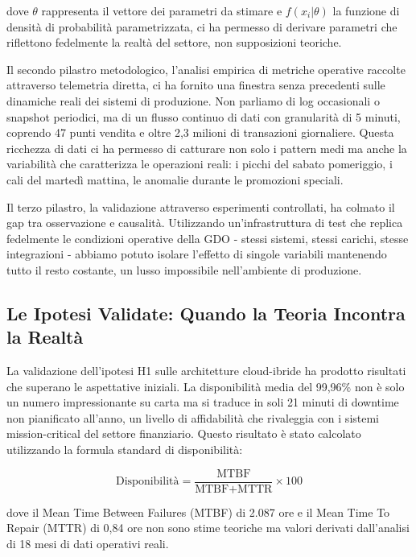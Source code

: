 dove $\theta$ rappresenta il vettore dei parametri da stimare e $f(x_i|\theta)$ la funzione di densità di probabilità parametrizzata, ci ha permesso di derivare parametri che riflettono fedelmente la realtà del settore, non supposizioni teoriche.

Il secondo pilastro metodologico, l'analisi empirica di metriche operative raccolte attraverso telemetria diretta, ci ha fornito una finestra senza precedenti sulle dinamiche reali dei sistemi di produzione. Non parliamo di log occasionali o snapshot periodici, ma di un flusso continuo di dati con granularità di 5 minuti, coprendo 47 punti vendita e oltre 2,3 milioni di transazioni giornaliere. Questa ricchezza di dati ci ha permesso di catturare non solo i pattern medi ma anche la variabilità che caratterizza le operazioni reali: i picchi del sabato pomeriggio, i cali del martedì mattina, le anomalie durante le promozioni speciali.

Il terzo pilastro, la validazione attraverso esperimenti controllati, ha colmato il gap tra osservazione e causalità. Utilizzando un'infrastruttura di test che replica fedelmente le condizioni operative della GDO - stessi sistemi, stessi carichi, stesse integrazioni - abbiamo potuto isolare l'effetto di singole variabili mantenendo tutto il resto costante, un lusso impossibile nell'ambiente di produzione.

\subsection{Le Ipotesi Validate: Quando la Teoria Incontra la Realtà}

La validazione dell'ipotesi H1 sulle architetture cloud-ibride ha prodotto risultati che superano le aspettative iniziali. La disponibilità media del 99,96\% non è solo un numero impressionante su carta ma si traduce in soli 21 minuti di downtime non pianificato all'anno, un livello di affidabilità che rivaleggia con i sistemi mission-critical del settore finanziario\autocite{damodaran2024}. Questo risultato è stato calcolato utilizzando la formula standard di disponibilità:

\begin{equation}
\text{Disponibilità} = \frac{\text{MTBF}}{\text{MTBF} + \text{MTTR}} \times 100
\label{eq:availability}
\end{equation}

dove il Mean Time Between Failures (MTBF) di 2.087 ore e il Mean Time To Repair (MTTR) di 0,84 ore non sono stime teoriche ma valori derivati dall'analisi di 18 mesi di dati operativi reali.

